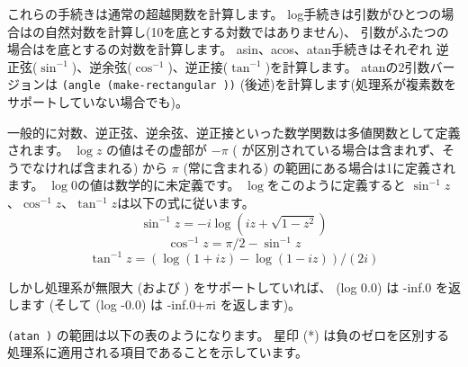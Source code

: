 \begin{entry}{%
}

これらの手続きは通常の超越関数を計算します。
{\cf log}手続きは引数がひとつの場合はの自然対数を計算し(10を底とする対数ではありません)、
引数がふたつの場合はを底とするの対数を計算します。
{\cf asin}、{\cf acos}、{\cf atan}手続きはそれぞれ
逆正弦($\sin^{-1}$)、逆余弦($\cos^{-1}$)、逆正接($\tan^{-1}$)を計算します。
{\cf atan}の2引数バージョンは
{\tt (angle (make-rectangular  ))}
(後述)を計算します(処理系が複素数をサポートしていない場合でも)。

一般的に対数、逆正弦、逆余弦、逆正接といった数学関数は多値関数として定義されます。
$\log z$ の値はその虚部が $-\pi$ ({} が区別されている場合は含まれず、そうでなければ含まれる)
から $\pi$ (常に含まれる) の範囲にある場合は1に定義されます。
$\log 0$の値は数学的に未定義です。
$\log$をこのように定義すると
$\sin^{-1} z$、$\cos^{-1} z$、$\tan^{-1} z$は以下の式に従います。
$$\sin^{-1} z = -i \log (i z + \sqrt{1 - z^2})$$
$$\cos^{-1} z = \pi / 2 - \sin^{-1} z$$
$$\tan^{-1} z = (\log (1 + i z) - \log (1 - i z)) / (2 i)$$

しかし処理系が無限大 (および {}) をサポートしていれば、
{\cf (log 0.0)} は {\cf -inf.0} を返します
(そして {\cf (log -0.0)} は {\cf -inf.0+$\pi$i} を返します)。

\texttt{({\cf atan}  )} の範囲は以下の表のようになります。
星印 (*) は負のゼロを区別する処理系に適用される項目であることを示しています。


\end{entry}
